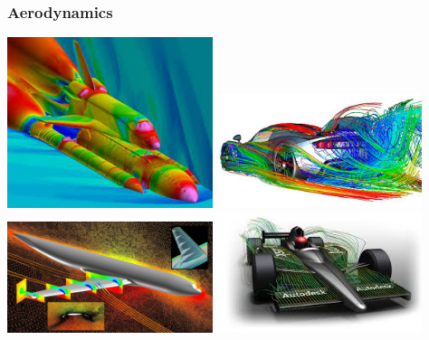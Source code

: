 \documentclass[handout]{beamer}
{
\usepackage{fullpage}
\usepackage{hyperref}
\usepackage{amssymb} 
}
\begin{document}
\begin{frame}
\frametitle{Aerodynamics}
  \begin{center}
   \includegraphics[width=0.45\textwidth]{figures/Apollo.jpg}
   \hfill
   \includegraphics[width=0.45\textwidth]{figures/MacLaren.png}
   \vfill
   \includegraphics[width=0.45\textwidth]{figures/Nielsen.jpg}
   \hfill
  \includegraphics[width=0.45\textwidth]{figures/F1.jpg}
  \end{center}

\end{frame}
\end{document}
